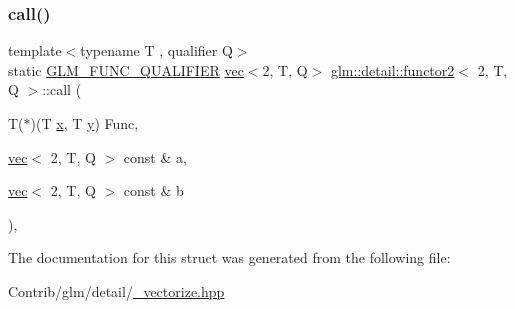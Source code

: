 \subsubsection{\texorpdfstring{call()}{call()}}
{\footnotesize\ttfamily template$<$typename T , qualifier Q$>$ \\
static \mbox{\hyperlink{setup_8hpp_a33fdea6f91c5f834105f7415e2a64407}{G\+L\+M\+\_\+\+F\+U\+N\+C\+\_\+\+Q\+U\+A\+L\+I\+F\+I\+ER}} \mbox{\hyperlink{structglm_1_1vec}{vec}}$<$2, T, Q$>$ \mbox{\hyperlink{structglm_1_1detail_1_1functor2}{glm\+::detail\+::functor2}}$<$ 2, T, Q $>$\+::call (\begin{DoxyParamCaption}\item[{T($\ast$)(T \mbox{\hyperlink{_s_d_l__opengl_8h_ad0e63d0edcdbd3d79554076bf309fd47}{x}}, T \mbox{\hyperlink{_s_d_l__opengl_8h_a1675d9d7bb68e1657ff028643b4037e3}{y}})}]{Func,  }\item[{\mbox{\hyperlink{structglm_1_1vec}{vec}}$<$ 2, T, Q $>$ const \&}]{a,  }\item[{\mbox{\hyperlink{structglm_1_1vec}{vec}}$<$ 2, T, Q $>$ const \&}]{b }\end{DoxyParamCaption})\hspace{0.3cm}{\ttfamily [inline]}, {\ttfamily [static]}}



The documentation for this struct was generated from the following file\+:\begin{DoxyCompactItemize}
\item 
Contrib/glm/detail/\mbox{\hyperlink{__vectorize_8hpp}{\+\_\+vectorize.\+hpp}}\end{DoxyCompactItemize}
